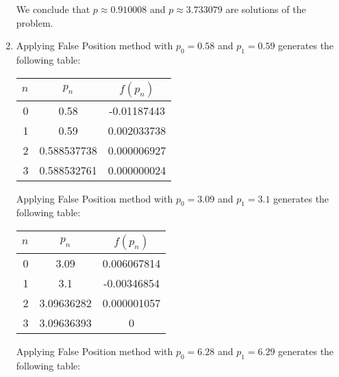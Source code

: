 \documentclass[../../../../Assignments]{subfiles}
\begin{document}
\begin{solution}
\begin{enumerate}[label = \alph*)]
            We conclude that \(p \approx \num{0.910008}\) and \(p \approx
            \num{3.733079}\) are solutions of the problem.

        \item Applying False Position method with \(p_0 = \num{0.58}\) and \(p_1
            = \num{0.59}\) generates the following table:

            \begin{table}[H]
                \centering
                \begin{tabular}{r S[table-format=1.9] S[table-format=-1.9]}
                    \toprule
                    \(n\)  &   {\(p_n\)}   &  {\(f(p_n)\)}  \\
                      &  0.58         &  -0.01187443   \\
                        1  &  0.59         &   0.002033738  \\
                        2  &  0.588537738  &   0.000006927  \\
                        3  &  0.588532761  &   0.000000024  \\
                        \bottomrule
                \end{tabular}
            \end{table}

            Applying False Position method with \(p_0 = \num{3.09}\) and \(p_1 =
            \num{3.1}\) generates the following table:

            \begin{table}[H]
                \centering
                \begin{tabular}{r S[table-format=1.8] S[table-format=-1.9]}
                    \toprule
                    \(n\)  &   {\(p_n\)}   &  {\(f(p_n)\)}  \\
                      &  3.09         &   0.006067814  \\
                        1  &  3.1          &  -0.00346854   \\
                        2  &  3.09636282   &   0.000001057  \\
                        3  &  3.09636393   &   0            \\
                    \bottomrule
                \end{tabular}
            \end{table}

            Applying False Position method with \(p_0 = \num{6.28}\) and \(p_1 =
            \num{6.29}\) generates the following table:


\end{enumerate}
\end{solution}
\end{document}
